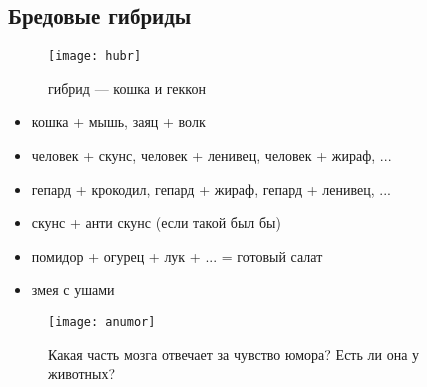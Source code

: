 \subsection{Бредовые гибриды}

\begin{figure}[ht!]
    \centering
    \texttt{[image: hubr]}
    \caption{гибрид --- кошка и геккон}
\end{figure}

\begin{itemize}
\item кошка + мышь, заяц + волк
\item человек + скунс, человек + ленивец, человек + жираф, ...
\item гепард + крокодил, гепард + жираф, гепард + ленивец, ...
\item скунс + анти скунс (если такой был бы)
\item помидор + огурец + лук + ... = готовый салат
\item змея с ушами

\end{itemize}
\begin{figure}[ht!]
    \centering
    \texttt{[image: anumor]}
    \caption{Какая часть мозга отвечает за чувство юмора? Есть ли она у животных?}
\end{figure}
